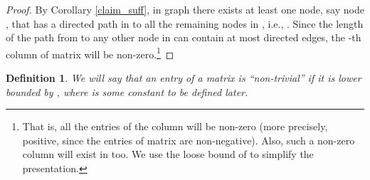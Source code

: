 \documentclass[letterpaper, 11pt]{article}
\newtheorem{definition}{Definition}[section]
\begin{document}
\begin{proof}
By Corollary \ref{claim_suff}, in graph  there exists at least one node, say
node , that has a directed path in  to all the remaining nodes in , i.e., .
Since the length of the path from  to any other node in  can contain
at most  directed edges,
the -th column of matrix  will
be non-zero.\footnote{That is, all the entries of the column will be
non-zero (more precisely, positive, since the entries of matrix 
are non-negative).
Also, such a non-zero column will exist in  too.
We use the loose bound of  to simplify the presentation. }
\end{proof}


\begin{definition}
We will say that an entry of a matrix is ``non-trivial'' if it is lower
bounded by , where  is some constant to be defined later.
\end{definition}
\end{document}
